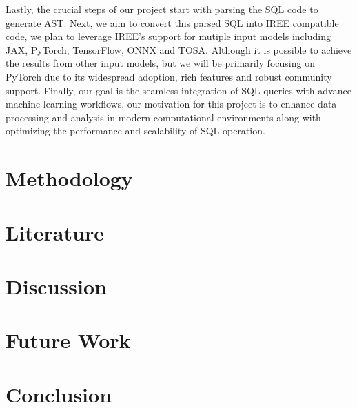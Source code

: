 \documentclass{article}
\begin{document}
Lastly, the crucial steps of our project start with parsing the SQL code to generate AST. Next, we aim to convert this parsed SQL into IREE compatible code, we plan to leverage IREE's support for mutiple input models including JAX, PyTorch, TensorFlow, ONNX and TOSA. Although it is possible to achieve the results from other input models, but we will be primarily focusing on PyTorch due to its widespread adoption, rich features and robust community support. Finally, our goal is the seamless integration of SQL queries with advance machine learning workflows, our motivation for this project is to enhance data processing and analysis in modern computational environments along with optimizing the performance and scalability of SQL operation.
\section{Methodology}
\section{Literature}
\section{Discussion}
\section{Future Work}
\section {Conclusion}       
\end{document}
